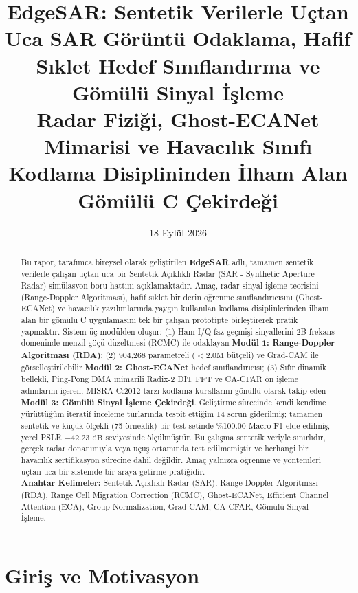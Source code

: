 \documentclass[11pt,a4paper]{article}
\title{
    \vspace{0.8cm}
    \LARGE \textbf{\textcolor{navyblue}{EdgeSAR: Sentetik Verilerle Uçtan Uca SAR Görüntü Odaklama, Hafif Sıklet Hedef Sınıflandırma ve Gömülü Sinyal İşleme}}\\[1.3cm]
    \large \textbf{\textcolor{steelcyan}{Radar Fiziği, Ghost-ECANet Mimarisi ve Havacılık Sınıfı Kodlama Disiplininden İlham Alan Gömülü C Çekirdeği}}
}
\author{
}
\date{\small 18 Eylül 2026}
\begin{document}
\maketitle

\begin{abstract}
\noindent\small
Bu rapor, tarafımca bireysel olarak geliştirilen \textbf{EdgeSAR} adlı, tamamen sentetik verilerle çalışan uçtan uca bir Sentetik Açıklıklı Radar (SAR - Synthetic Aperture Radar) simülasyon boru hattını açıklamaktadır. Amaç, radar sinyal işleme teorisini (Range-Doppler Algoritması), hafif sıklet bir derin öğrenme sınıflandırıcısını (Ghost-ECANet) ve havacılık yazılımlarında yaygın kullanılan kodlama disiplinlerinden ilham alan bir gömülü C uygulamasını tek bir çalışan prototipte birleştirerek pratik yapmaktır. Sistem üç modülden oluşur: (1) Ham I/Q faz geçmişi sinyallerini 2B frekans domeninde menzil göçü düzeltmesi (RCMC) ile odaklayan \textbf{Modül 1: Range-Doppler Algoritması (RDA)}; (2) 904,268 parametreli ($<2.0\text{M}$ bütçeli) ve Grad-CAM ile görselleştirilebilir \textbf{Modül 2: Ghost-ECANet} hedef sınıflandırıcısı; (3) Sıfır dinamik bellekli, Ping-Pong DMA mimarili Radix-2 DIT FFT ve CA-CFAR ön işleme adımlarını içeren, MISRA-C:2012 tarzı kodlama kurallarını gönüllü olarak takip eden \textbf{Modül 3: Gömülü Sinyal İşleme Çekirdeği}. Geliştirme sürecinde kendi kendime yürüttüğüm iteratif inceleme turlarında tespit ettiğim 14 sorun giderilmiş; tamamen sentetik ve küçük ölçekli (75 örneklik) bir test setinde \%100.00 Macro F1 elde edilmiş, yerel PSLR $-42.23\text{ dB}$ seviyesinde ölçülmüştür. Bu çalışma sentetik veriyle sınırlıdır, gerçek radar donanımıyla veya uçuş ortamında test edilmemiştir ve herhangi bir havacılık sertifikasyon sürecine dahil değildir. Amaç yalnızca öğrenme ve yöntemleri uçtan uca bir sistemde bir araya getirme pratiğidir.\\

\noindent\small\textbf{Anahtar Kelimeler:} Sentetik Açıklıklı Radar (SAR), Range-Doppler Algoritması (RDA), Range Cell Migration Correction (RCMC), Ghost-ECANet, Efficient Channel Attention (ECA), Group Normalization, Grad-CAM, CA-CFAR, Gömülü Sinyal İşleme.
\end{abstract}


\newpage

{\small\tableofcontents}
\newpage
\section{Giriş ve Motivasyon}
\end{document}
